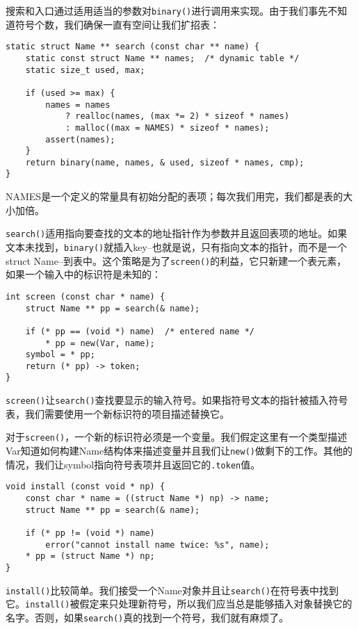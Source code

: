 搜索和入口通过适用适当的参数对\verb|binary()|进行调用来实现。由于我们事先不知道符号个数，我们确保一直有空间让我们扩招表：

\begin{lstlisting}
static struct Name ** search (const char ** name) {
	static const struct Name ** names;	/* dynamic table */
	static size_t used, max;

	if (used >= max) {
		names = names
			? realloc(names, (max *= 2) * sizeof * names)
			: malloc((max = NAMES) * sizeof * names);
		assert(names);
	}
	return binary(name, names, & used, sizeof * names, cmp);
}
\end{lstlisting}

NAMES是一个定义的常量具有初始分配的表项；每次我们用完，我们都是表的大小加倍。

\verb|search()|适用指向要查找的文本的地址指针作为参数并且返回表项的地址。如果文本未找到，\verb|binary()|就插入key--也就是说，只有指向文本的指针，而不是一个struct Name--到表中。这个策略是为了\verb|screen()|的利益，它只新建一个表元素，如果一个输入中的标识符是未知的：

\begin{lstlisting}
int screen (const char * name) {
	struct Name ** pp = search(& name);

	if (* pp == (void *) name)	/* entered name */
		* pp = new(Var, name);
	symbol = * pp;
	return (* pp) -> token;
}
\end{lstlisting}

\verb|screen()|让\verb|search()|查找要显示的输入符号。如果指符号文本的指针被插入符号表，我们需要使用一个新标识符的项目描述替换它。

对于\verb|screen()|，一个新的标识符必须是一个变量。我们假定这里有一个类型描述Var知道如何构建Name结构体来描述变量并且我们让\verb|new()|做剩下的工作。其他的情况，我们让symbol指向符号表项并且返回它的\verb|.token|值。

\begin{lstlisting}
void install (const void * np) {
	const char * name = ((struct Name *) np) -> name;
	struct Name ** pp = search(& name);

	if (* pp != (void *) name)
		error("cannot install name twice: %s", name);
	* pp = (struct Name *) np;
}
\end{lstlisting}

\verb|install()|比较简单。我们接受一个Name对象并且让\verb|search()|在符号表中找到它。\verb|install()|被假定来只处理新符号，所以我们应当总是能够插入对象替换它的名字。否则，如果\verb|search()|真的找到一个符号，我们就有麻烦了。

